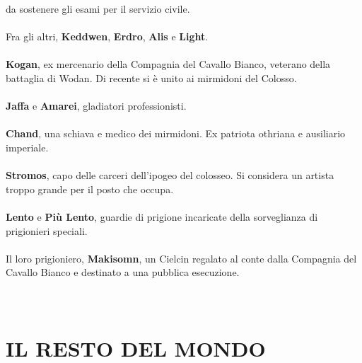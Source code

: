 da sostenere gli esami per il servizio civile.
\leavevmode\\
\leavevmode\\
\phantom{123}Fra gli altri, \textbf{Keddwen}, \textbf{Erdro}, \textbf{Alis} e
\textbf{Light}.
\leavevmode\\
\leavevmode\\
\phantom{123}\textbf{Kogan}, ex mercenario della Compagnia del Cavallo Bianco,
veterano della battaglia di Wodan. Di recente si è unito ai mirmidoni
del Colosso.
\leavevmode\\
\leavevmode\\
\phantom{123}\textbf{Jaffa} e \textbf{Amarei}, gladiatori professionisti.
\leavevmode\\
\leavevmode\\
\phantom{123}\textbf{Chand}, una schiava e medico dei mirmidoni. Ex patriota othriana
e ausiliario imperiale.
\leavevmode\\
\leavevmode\\
\phantom{123}\textbf{Stromos}, capo delle carceri dell'ipogeo del colosseo. Si
considera un artista troppo grande per il posto che occupa.
\leavevmode\\
\leavevmode\\
\phantom{123}\textbf{Lento} e \textbf{Più Lento}, guardie di prigione incaricate
della sorveglianza di prigionieri speciali.
\leavevmode\\
\leavevmode\\
\phantom{123}Il loro prigioniero, \textbf{Makisomn}, un Cielcin regalato al conte
dalla Compagnia del Cavallo Bianco e destinato a una pubblica
esecuzione.
\leavevmode\\
\leavevmode\\
\leavevmode\\
\section{IL RESTO DEL MONDO}

